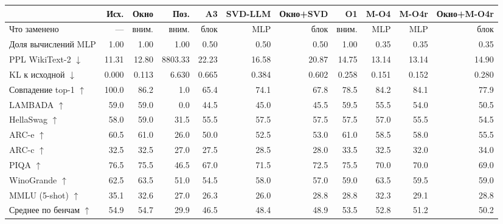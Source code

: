\begin{tabular}{lrrrrrrrrrr}
\toprule
 & Исх. & Окно & Поз. & A3 & SVD-LLM & Окно+SVD & O1 & M-O4 & M-O4r & Окно+M-O4r \\
\midrule
Что заменено & — & вним. & вним. & блок & MLP & блок & вним. & MLP & MLP & блок \\
Доля вычислений MLP & 1.00 & 1.00 & 1.00 & 0.50 & 0.50 & 0.50 & 1.00 & 0.35 & 0.35 & 0.35 \\
PPL WikiText-2 $\downarrow$ & 11.31 & 12.80 & 8803.33 & 22.23 & 16.58 & 20.87 & 14.75 & 13.14 & 13.14 & 14.90 \\
KL к исходной $\downarrow$ & 0.000 & 0.113 & 6.630 & 0.665 & 0.384 & 0.602 & 0.258 & 0.151 & 0.152 & 0.280 \\
Совпадение top-1 $\uparrow$ & 100.0 & 86.2 & 1.0 & 65.4 & 74.1 & 67.8 & 78.5 & 84.2 & 84.1 & 77.9 \\
LAMBADA $\uparrow$ & 59.0 & 59.0 & 0.0 & 44.5 & 45.0 & 45.5 & 59.5 & 55.5 & 54.0 & 50.5 \\
HellaSwag $\uparrow$ & 58.0 & 59.0 & 31.5 & 55.5 & 57.5 & 57.5 & 57.5 & 57.0 & 55.5 & 54.5 \\
ARC-e $\uparrow$ & 60.5 & 61.0 & 26.0 & 50.0 & 52.5 & 53.0 & 61.0 & 58.5 & 58.0 & 55.5 \\
ARC-c $\uparrow$ & 32.5 & 32.5 & 27.0 & 27.5 & 28.5 & 28.0 & 33.5 & 32.5 & 32.0 & 34.0 \\
PIQA $\uparrow$ & 76.5 & 75.5 & 46.5 & 67.0 & 71.5 & 72.5 & 75.5 & 70.0 & 70.0 & 69.0 \\
WinoGrande $\uparrow$ & 62.5 & 63.5 & 51.0 & 54.5 & 58.0 & 57.0 & 59.0 & 63.5 & 59.5 & 59.0 \\
MMLU (5-shot) $\uparrow$ & 35.1 & 32.6 & 27.0 & 26.3 & 26.0 & 28.8 & 28.8 & 32.3 & 29.1 & 28.8 \\
Среднее по бенчам $\uparrow$ & 54.9 & 54.7 & 29.9 & 46.5 & 48.4 & 48.9 & 53.5 & 52.8 & 51.2 & 50.2 \\
\bottomrule
\end{tabular}
